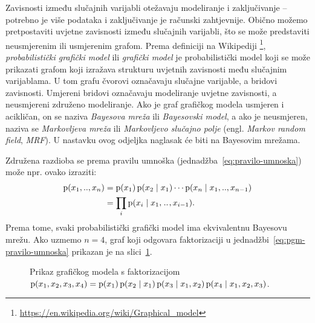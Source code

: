 \documentclass[utf8, diplomski, lmodern]{fer}
\begin{document}
Zavisnosti između slučajnih varijabli otežavaju modeliranje i zaključivanje -- potrebno je više podataka i zaključivanje je računski zahtjevnije. Obično možemo pretpostaviti uvjetne zavisnosti između slučajnih varijabli, što se može predstaviti neusmjerenim ili usmjerenim grafom. Prema definiciji na Wikipediji \footnote{\url{https://en.wikipedia.org/wiki/Graphical_model}}, \emph{probabilistički grafički model} ili \emph{grafički model} je probabilistički model koji se može prikazati grafom koji izražava strukturu uvjetnih zavisnosti među slučajnim varijablama. U tom grafu čvorovi označavaju slučajne varijable, a bridovi zavisnosti. Umjereni bridovi označavaju modeliranje uvjetne zavisnosti, a neusmjereni združeno modeliranje. Ako je graf grafičkog modela usmjeren i acikličan, on se naziva \emph{Bayesova mreža} ili \emph{Bayesovski model}, a ako je neusmjeren, naziva se \emph{Markovljeva mreža} ili \emph{Markovljevo slučajno polje} (engl. \textit{Markov random field}, \textit{MRF}). U nastavku ovog odjeljka naglasak će biti na Bayesovim mrežama.

Združena razdioba se prema pravilu umnoška (jednadžba~\ref{eq:pravilo-umnoska}) može npr. ovako izraziti:
\begin{align}
\operatorname*{\mathrm{p}}(x_1,..,x_n) 
&= \operatorname*{\mathrm{p}}(x_1)\operatorname*{\mathrm{p}}(x_2\mid x_1)\cdots\operatorname*{\mathrm{p}}(x_n\mid x_1,..,x_{n-1}) \\
&= \prod_i\operatorname*{\mathrm{p}}(x_i\mid x_1,\mkern1.5mu{..}\mkern1.5mu,x_{i-1}) \text{.}
\label{eq:pgm-pravilo-umnoska}
\end{align} 
Prema tome, svaki probabilistički grafički model ima ekvivalentnu Bayesovu mrežu. Ako uzmemo $n=4$, graf koji odgovara faktorizaciji u jednadžbi~\eqref{eq:pgm-pravilo-umnoska} prikazan je na slici~\ref{fig:bayesova-mreza}.

\begin{figure}
	\centering
	\caption{Prikaz grafičkog modela s faktorizacijom $\operatorname*{\mathrm{p}}(x_1,x_2,x_3,x_4)=\operatorname*{\mathrm{p}}(x_1)\operatorname*{\mathrm{p}}(x_2\mid x_1)\operatorname*{\mathrm{p}}(x_3\mid x_1,x_2)\operatorname*{\mathrm{p}}(x_4\mid x_1,x_2,x_3)$.}
	\label{fig:bayesova-mreza}
\end{figure}
\end{document}
